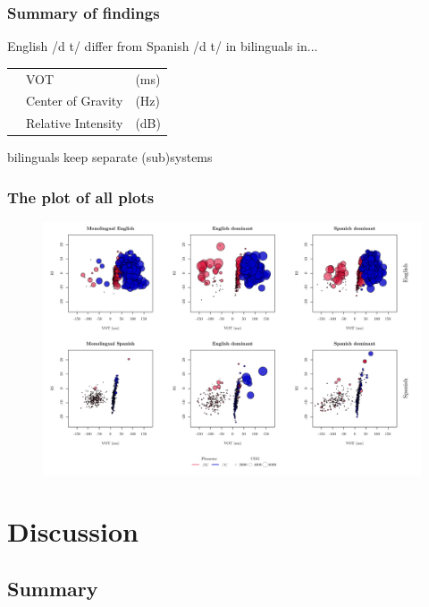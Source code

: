 \documentclass{beamer}
\newcommand{\cmark}{\ding{51}}%
\begin{document}
\begin{frame}
\frametitle{Summary of findings}
English /d t/ differ from Spanish /d t/ in bilinguals in...
\begin{center}
\begin{tabular}{l l l}
\cmark & VOT & (ms) \\
\cmark & Center of Gravity & (Hz) \\
\cmark & Relative Intensity & (dB) \\
\end{tabular}
\end{center}
bilinguals keep separate (sub)systems
\end{frame}

\begin{frame}
\frametitle{The plot of all plots}
	\begin{figure}
		\centering
		\includegraphics[scale=0.45]{figures/all.pdf}
	\end{figure}
\end{frame}

\section{Discussion}


\subsection{Summary}
\end{document}
